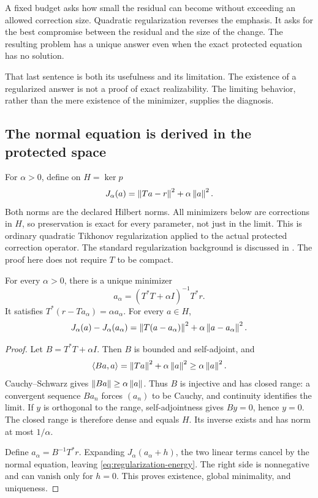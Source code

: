\clearpage
{}\label{sec:regularized-repair}
A fixed budget asks how small the residual can become without exceeding an allowed correction size. Quadratic regularization reverses the emphasis. It asks for the best compromise between the residual and the size of the change. The resulting problem has a unique answer even when the exact protected equation has no solution.

That last sentence is both its usefulness and its limitation. The existence of a regularized answer is not a proof of exact realizability. The limiting behavior, rather than the mere existence of the minimizer, supplies the diagnosis.

\subsection{The normal equation is derived in the protected space}
For $\alpha>0$, define on $H=\ker p$
\[
 J_\alpha(a)=\left\lVert Ta-r\right\rVert^2+\alpha\left\lVert a\right\rVert^2.
\]
Both norms are the declared Hilbert norms. All minimizers below are corrections in $H$, so preservation is exact for every parameter, not just in the limit. This is ordinary quadratic Tikhonov regularization applied to the actual protected correction operator. The standard regularization background is discussed in \cite{clason-inverse}. The proof here does not require $T$ to be compact.

\begin{theorem}\label{WR06}
For every $\alpha>0$, there is a unique minimizer
\[
 a_\alpha=(T^*T+\alpha I)^{-1}T^*r.
\]
It satisfies $T^*(r-Ta_\alpha)=\alpha a_\alpha$. For every $a\in H$,
\begin{equation}\label{eq:regularization-energy}
 J_\alpha(a)-J_\alpha(a_\alpha)
 =\left\lVert T(a-a_\alpha)\right\rVert^2+\alpha\left\lVert a-a_\alpha\right\rVert^2.
\end{equation}
\end{theorem}
\begin{proof}
Let $B=T^*T+\alpha I$. Then $B$ is bounded and self-adjoint, and
\[
 \langle Ba,a\rangle=\left\lVert Ta\right\rVert^2+\alpha\left\lVert a\right\rVert^2
 \ge\alpha\left\lVert a\right\rVert^2.
\]
Cauchy--Schwarz gives $\left\lVert Ba\right\rVert\ge\alpha\left\lVert a\right\rVert$. Thus $B$ is injective and has closed range: a convergent sequence $Ba_n$ forces $(a_n)$ to be Cauchy, and continuity identifies the limit. If $y$ is orthogonal to the range, self-adjointness gives $By=0$, hence $y=0$. The closed range is therefore dense and equals $H$. Its inverse exists and has norm at most $1/\alpha$.

Define $a_\alpha=B^{-1}T^*r$. Expanding $J_\alpha(a_\alpha+h)$, the two linear terms cancel by the normal equation, leaving \eqref{eq:regularization-energy}. The right side is nonnegative and can vanish only for $h=0$. This proves existence, global minimality, and uniqueness.
\end{proof}

